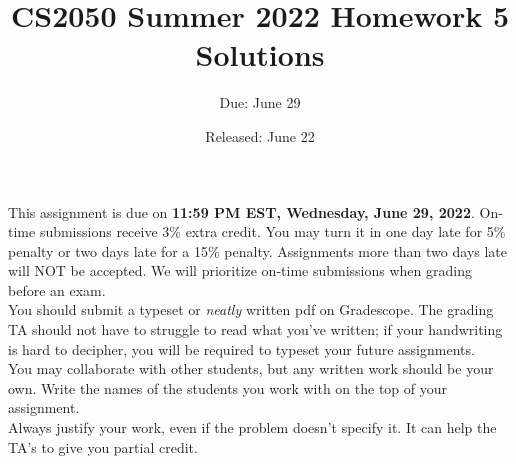 \documentclass{article}
\title{CS2050 Summer 2022 Homework 5 Solutions}
\author{Due: June 29}
\date{Released: June 22}
\begin{document}
\maketitle

This assignment is due on \textbf{11:59 PM EST, Wednesday, June 29, 2022}.  On-time submissions receive 3\% extra credit. You may turn it in one day late for 5\% penalty or two days late for a 15\% penalty. Assignments more than two days late will NOT be accepted.  We will prioritize on-time submissions when grading before an exam. \\ 

You should submit a typeset or \emph{neatly} written pdf on Gradescope.  The grading TA should not have to struggle to read what you've written; if your handwriting is hard to decipher, you will be required to typeset your future assignments.\\ 

You may collaborate with other students, but any written work should be your own. Write the names of the students you work with on the top of your assignment.\\

Always justify your work, even if the problem doesn't specify it. It can help the TA's to give you partial credit.
\end{document}
